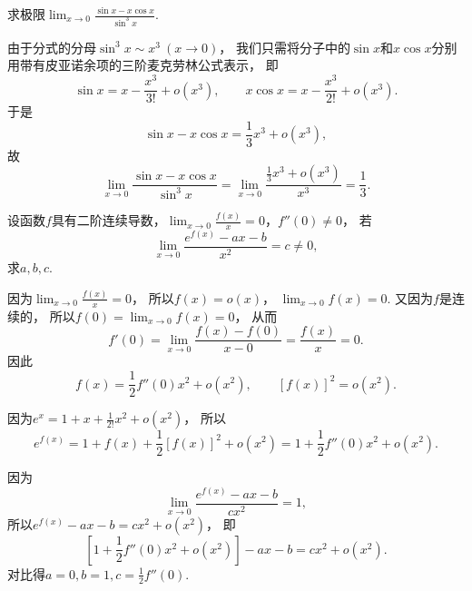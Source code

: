 \begin{example}
求极限\(\lim_{x\to0}\frac{\sin x - x \cos x}{\sin^3 x}\).
\begin{solution}
由于分式的分母\(\sin^3 x \sim x^3\ (x\to0)\)，
我们只需将分子中的\(\sin x\)和\(x \cos x\)分别用带有皮亚诺余项的三阶麦克劳林公式表示，
即\begin{equation*}
	\sin x = x - \frac{x^3}{3!} + o(x^3),
	\qquad
	x \cos x = x - \frac{x^3}{2!} + o(x^3).
\end{equation*}
于是\begin{equation*}
	\sin x - x \cos x = \frac{1}{3} x^3 + o(x^3),
\end{equation*}
故\begin{equation*}
	\lim_{x\to0}\frac{\sin x - x \cos x}{\sin^3 x}
	= \lim_{x\to0}\frac{\frac{1}{3} x^3 + o(x^3)}{x^3} = \frac{1}{3}.
\end{equation*}
\end{solution}
\end{example}

\begin{example}
设函数\(f\)具有二阶连续导数，\(\lim_{x\to0} \frac{f(x)}{x} = 0\)，\(f''(0)\neq0\)，
若\begin{equation*}
	\lim_{x\to0} \frac{e^{f(x)}-ax-b}{x^2} = c \neq 0,
\end{equation*}
求\(a,b,c\).
\begin{solution}
因为\(\lim_{x\to0} \frac{f(x)}{x} = 0\)，
所以\(f(x) = o(x)\)，
\(\lim_{x\to0} f(x) = 0\).
又因为\(f\)是连续的，
所以\(f(0) = \lim_{x\to0} f(x) = 0\)，
从而\begin{equation*}
	f'(0) = \lim_{x\to0} \frac{f(x) - f(0)}{x - 0} = \frac{f(x)}{x} = 0.
\end{equation*}
因此\begin{equation*}
	f(x) = \frac12 f''(0) x^2 + o(x^2),
	\qquad
	[f(x)]^2 = o(x^2).
\end{equation*}

因为\(e^x = 1 + x + \frac{1}{2!} x^2 + o(x^2)\)，
所以\begin{equation*}
	e^{f(x)} = 1 + f(x) + \frac{1}{2} [f(x)]^2 + o(x^2)
	= 1 + \frac{1}{2} f''(0) x^2 + o(x^2).
\end{equation*}

因为\begin{equation*}
	\lim_{x\to0} \frac{e^{f(x)} - ax - b}{c x^2} = 1,
\end{equation*}
所以\(e^{f(x)} - ax - b = c x^2 + o(x^2)\)，
即\begin{equation*}
	\left[ 1 + \frac{1}{2} f''(0) x^2 + o(x^2) \right] - ax - b = c x^2 + o(x^2).
\end{equation*}
对比得\(a = 0, b = 1, c = \frac{1}{2} f''(0)\).
\end{solution}
\end{example}

